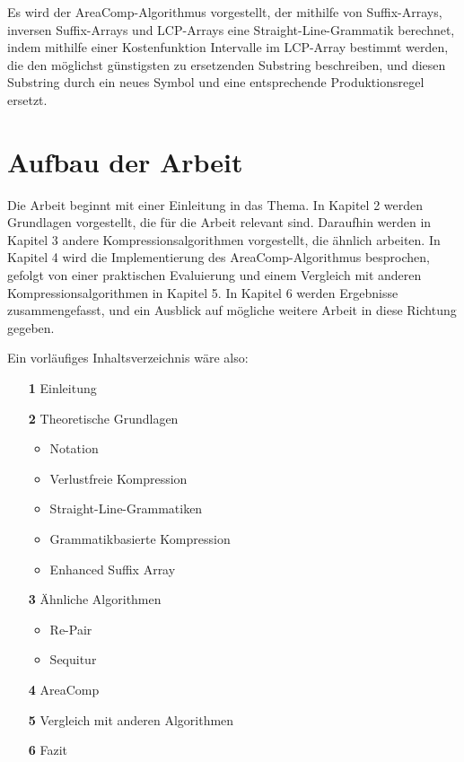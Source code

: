 Es wird der AreaComp-Algorithmus vorgestellt, der mithilfe von Suffix-Arrays, inversen Suffix-Arrays und LCP-Arrays \cite{manber_suffix_1993} eine Straight-Line-Grammatik berechnet, indem mithilfe einer Kostenfunktion Intervalle im LCP-Array bestimmt werden, die den möglichst günstigsten zu ersetzenden Substring beschreiben, und diesen Substring durch ein neues Symbol und eine entsprechende Produktionsregel ersetzt.

\section{Aufbau der Arbeit}

Die Arbeit beginnt mit einer Einleitung in das Thema. In Kapitel 2 werden Grundlagen vorgestellt, die für die Arbeit relevant sind. Daraufhin werden in Kapitel 3 andere Kompressionsalgorithmen vorgestellt, die ähnlich arbeiten. In Kapitel 4 wird die Implementierung des AreaComp-Algorithmus besprochen, gefolgt von einer praktischen Evaluierung und einem Vergleich mit anderen Kompressionsalgorithmen in Kapitel 5. In Kapitel 6 werden Ergebnisse zusammengefasst, und ein Ausblick auf mögliche weitere Arbeit in diese Richtung gegeben.

Ein vorläufiges Inhaltsverzeichnis wäre also:

\begin{enumerate}
    \item[\textbf{1}] Einleitung
    \item[\textbf{2}] Theoretische Grundlagen
    \begin{itemize}
        \item Notation
        \item Verlustfreie Kompression
        \item Straight-Line-Grammatiken
        \item Grammatikbasierte Kompression
        \item Enhanced Suffix Array
    \end{itemize}
    \item[\textbf{3}] Ähnliche Algorithmen
    \begin{itemize}
        \item Re-Pair
        \item Sequitur
    \end{itemize}
    \item[\textbf{4}] AreaComp
    \item[\textbf{5}] Vergleich mit anderen Algorithmen
    \item[\textbf{6}] Fazit
\end{enumerate}